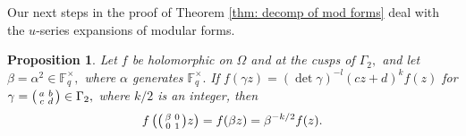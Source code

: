 \documentclass[11pt]{amsart}
\newtheorem{proposition}[theorem]{Proposition}
\theoremstyle{definition}
\newenvironment{psmallmatrix}
{\left(\begin{smallmatrix}}
	{\end{smallmatrix}\right)}
\numberwithin{equation}{section}
\newcommand{\bbF}{\mathbb{F}}		%
\begin{document}
Our next steps in the proof of Theorem \ref{thm: decomp of mod forms} deal with the $u$-series expansions of modular forms. 
\begin{proposition}\label{p: generator trick}
Let $f$ be holomorphic on $\Omega$ and at the cusps of $\Gamma_2,$ and let $\beta=\alpha^2\in \bbF_q^{\times},$ where $\alpha$ generates $\bbF_q^{\times}.$ If $f(\gamma z)=(\det\gamma)^{-l}(cz+d)^kf(z)$ for $\displaystyle{\gamma=\begin{psmallmatrix}a&b\\c&d\end{psmallmatrix}\in \Gamma_2},$ where $k/2$ is an integer, then \[f\left(\begin{psmallmatrix}\beta&0\\0&1\end{psmallmatrix}z \right) = f(\beta z)=\beta^{-k/2}f(z).\]
\end{proposition}
\end{document}

